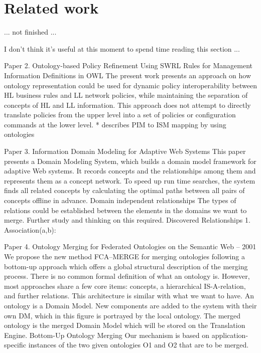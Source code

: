 \documentclass{sig-alternate}
\begin{document}
\section{Related work}

... not finished ...

I don't think it's useful at this moment to spend time reading this section ...

Paper 2. Ontology-based Policy Refinement Using SWRL Rules for Management Information Definitions in OWL
The present work presents an approach on how ontology representation could be used for dynamic policy interoperability between HL business rules and LL network policies, while maintaining the separation of concepts of HL and LL information. 
This approach does not attempt to directly translate policies from the upper level into a set of policies or configuration commands at the lower level.
* describes PIM to ISM mapping by using ontologies

Paper 3. Information Domain Modeling for Adaptive Web Systems
This paper presents a Domain Modeling System, which builds a domain model framework for adaptive Web systems. It records concepts and the relationships among them and represents them as a concept network. To speed up run time searches, the system finds all related concepts by calculating the optimal paths between all pairs of concepts offline in advance. 
Domain independent relationships
The types of relations could be established between the elements in the domains we want to merge. Further study and thinking on this required.
Discovered Relationships
1. Association(a,b): 

Paper 4. Ontology Merging for Federated Ontologies on the Semantic Web – 2001
We propose the new method FCA–MERGE for merging ontologies following a bottom-up approach which offers a global structural description of the merging process. There is no common formal definition of what an ontology is. However, most approaches share a few core items: concepts, a hierarchical IS-A-relation, and further relations.
This architecture is similar with what we want to have. An ontology is a Domain Model. New components are added to the system with their own DM, which in this figure is portrayed by the local ontology. The merged ontology is the merged Domain Model which will be stored on the Translation Engine.
Bottom-Up Ontology Merging
Our mechanism is based on application-specific instances of the two given ontologies O1 and O2 that are to be merged. 
\end{document}
